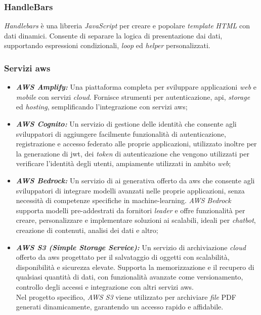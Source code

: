 \subsubsection{HandleBars}

\textit{Handlebars} è una libreria \textit{JavaScript} per creare e popolare \textit{template} \textit{HTML} con dati dinamici. 
Consente di separare la logica di presentazione dai dati, supportando espressioni condizionali, \textit{loop} ed \textit{helper} personalizzati.

\subsubsection{Servizi \gls{aws}}

\begin{itemize}
\item \textbf{\textit{AWS Amplify:}} Una piattaforma completa per sviluppare applicazioni \textit{web} e \textit{mobile} con servizi \textit{cloud}. 
Fornisce strumenti per autenticazione, \gls{api}, \textit{storage} ed \textit{hosting}, semplificando l'integrazione con servizi \gls{aws};
\item \textbf{\textit{AWS Cognito:}} Un servizio di gestione delle identità che consente agli sviluppatori di aggiungere facilmente funzionalità di autenticazione, registrazione e accesso federato alle proprie applicazioni,
utilizzato inoltre per la generazione di \gls{jwt}, dei \textit{token} di autenticazione che vengono utilizzati per verificare l'identità degli utenti, ampiamente utilizzati in ambito \textit{web};
\item \textbf{\textit{AWS Bedrock:}} Un servizio di \gls{ai} generativa offerto da \gls{aws} che consente agli sviluppatori di integrare modelli avanzati nelle proprie applicazioni, senza necessità di competenze specifiche in \gls{machine-learning}. 
\textit{AWS Bedrock} supporta modelli pre-addestrati da fornitori \textit{leader} e offre funzionalità per creare, personalizzare e implementare soluzioni \gls{ai} scalabili, ideali per \textit{chatbot}, creazione di contenuti, analisi dei dati e altro;
\item \textbf{\textit{AWS S3 (Simple Storage Service):}} Un servizio di archiviazione \textit{cloud} offerto da \gls{aws} progettato per il salvataggio di oggetti con scalabilità, disponibilità e sicurezza elevate.
Supporta la memorizzazione e il recupero di qualsiasi quantità di dati, con funzionalità avanzate come versionamento, controllo degli accessi e integrazione con altri servizi \gls{aws}. \\
Nel progetto specifico, \textit{AWS S3} viene utilizzato per archiviare \textit{file} PDF generati dinamicamente, garantendo un accesso rapido e affidabile.
\end{itemize}

